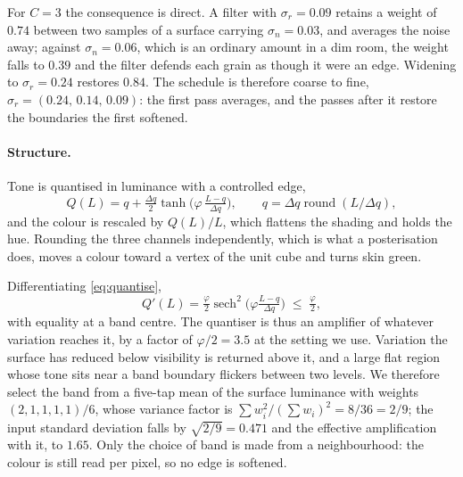 \documentclass{article}
\theoremstyle{definition}
\begin{document}
For $C=3$ the consequence is direct. A filter with $\sigma_r=0.09$ retains a
weight of $0.74$ between two samples of a surface carrying $\sigma_n=0.03$, and
averages the noise away; against $\sigma_n=0.06$, which is an ordinary amount in
a dim room, the weight falls to $0.39$ and the filter defends each grain as
though it were an edge. Widening to $\sigma_r=0.24$ restores $0.84$. The schedule
is therefore coarse to fine, $\sigma_r = (0.24,\,0.14,\,0.09)$: the first pass
averages, and the passes after it restore the boundaries the first softened.

\paragraph{Structure.}
Tone is quantised in luminance with a controlled edge,
\begin{equation}
  \label{eq:quantise}
  Q(L) = q + \tfrac{\Delta q}{2}\tanh\!\Big(\varphi\,\tfrac{L-q}{\Delta q}\Big),
  \qquad q = \Delta q \operatorname{round}(L/\Delta q),
\end{equation}
and the colour is rescaled by $Q(L)/L$, which flattens the shading and holds the
hue. Rounding the three channels independently, which is what a posterisation
does, moves a colour toward a vertex of the unit cube and turns skin green.

Differentiating \eqref{eq:quantise},
\begin{equation}
  \label{eq:slope}
  Q'(L) = \tfrac{\varphi}{2}\operatorname{sech}^2\!\Big(\varphi\tfrac{L-q}{\Delta q}\Big)
  \;\le\; \tfrac{\varphi}{2},
\end{equation}
with equality at a band centre. The quantiser is thus an amplifier of whatever
variation reaches it, by a factor of $\varphi/2 = 3.5$ at the setting we use.
Variation the surface has reduced below visibility is returned above it, and a
large flat region whose tone sits near a band boundary flickers between two
levels. We therefore select the band from a five-tap mean of the surface
luminance with weights $(2,1,1,1,1)/6$, whose variance factor is
$\sum w_i^2 / (\sum w_i)^2 = 8/36 = 2/9$; the input standard deviation falls by
$\sqrt{2/9} = 0.471$ and the effective amplification with it, to $1.65$. Only the
choice of band is made from a neighbourhood: the colour is still read per pixel,
so no edge is softened.
\end{document}

